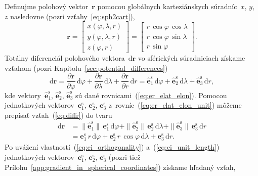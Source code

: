\documentclass[a4paper, 12pt]{book}
\newcommand{\diff}{\mathrm d}
\let\vec\mathbf
\begin{document}
Definujme polohový vektor~$\vec r$ pomocou globálnych karteziánskych 
súradníc~$x$, $y$, $z$ nasledovne (pozri vzťahy~\ref{eq:sph2cart}),
%
\begin{equation}
\vec r =
%
\begin{bmatrix}
x(\varphi, \lambda, r)\\
y(\varphi, \lambda, r)\\
z(\varphi, r)
\end{bmatrix}
%
=
%
\begin{bmatrix}
r \, \cos\varphi \, \cos\lambda\\
r \, \cos\varphi \, \sin\lambda\\
r \, \sin\varphi
\end{bmatrix}
%
{.}
\end{equation}
%
Totálny diferenciál polohového vektora~$\diff \vec r$ vo sférických 
súradniciach získame vzťahom (pozri Kapitolu~\ref{sec:potential_differences})
%
\begin{equation}
\label{eq:diffr}
\diff \vec r = \frac{\partial \vec r}{\partial \varphi} \, \diff \varphi 
+ \frac{\partial \vec r}{\partial \lambda} \, \diff \lambda + \frac{\partial 
\vec r}{\partial r} \, \diff r = \hat{\vec e}_1^\mathrm{s} \, \diff \varphi 
+ \hat{\vec e}_2^\mathrm{s} \, \diff \lambda + \hat{\vec e}_3^\mathrm{s} \, 
\diff r{,}
\end{equation}
%
kde vektory~$\hat{\vec e}_1^\mathrm{s}$, $\hat{\vec e}_2^\mathrm{s}$, 
$\hat{\vec e}_3^\mathrm{s}$ sú dané rovnicami~(\ref{eq:er_elat_elon}).  
Pomocou jednotkových vektorov~$\vec e_1^\mathrm{s}$, $\vec e_2^\mathrm{s}$, 
$\vec e_3^\mathrm{s}$ z~rovníc~(\ref{eq:er_elat_elon_unit}) môžeme prepísať 
vzťah~(\ref{eq:diffr}) do tvaru
%
\begin{equation}
\label{eq:diffr2}
\begin{split}
\diff \vec r &= \|\hat{\vec e}_1^\mathrm{s}\| \,\vec e_1^\mathrm{s} \, 
\diff\varphi + \|\hat{\vec e}_2^\mathrm{s}\| \, \vec e_2^\mathrm{s} \, 
\diff\lambda + \|\hat{\vec e}_3^\mathrm{s}\| \, \vec e_3^\mathrm{s} \, \diff 
r\\
%
&= \vec e_1^\mathrm{s} \, r \, \diff\varphi + \vec e_2^\mathrm{s} \, r \, 
\cos\varphi \, \diff\lambda + \vec e_3^\mathrm{s} \, \diff r{.}
\end{split}
\end{equation}
%
Po uvážení vlastností~(\ref{eq:ei_orthogonality}) a~(\ref{eq:ei_unit_length}) 
jednotkových vektorov~$\vec e_1^\mathrm{s}$, $\vec e_2^\mathrm{s}$, $\vec 
e_3^\mathrm{s}$ (pozri tiež 
Prílohu~\ref{app:gradient_in_spherical_coordinates}) získame hľadaný vzťah,
\end{document}
